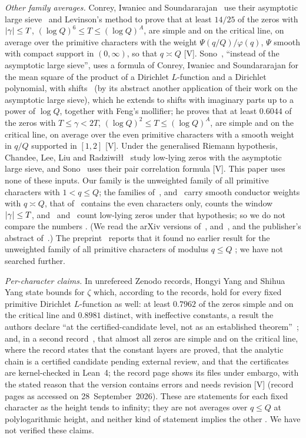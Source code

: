 \emph{Other family averages.} Conrey, Iwaniec and Soundararajan~\cite{CIS2} use their asymptotic large sieve~\cite{CIS1} and Levinson's method to
prove that at least $14/25$ of the zeros with $\lvert \gamma\rvert\le T$, $(\log Q)^6\le T\le(\log Q)^A$, are simple and on the critical line, on average over
the primitive characters with the weight $\Psi(q/Q)/\varphi(q)$, $\Psi$ smooth with compact support in $(0,\infty)$, so that $q\asymp Q$ [V].
Sono~\cite{Sono21}, ``instead of the asymptotic large sieve'', uses a formula of Conrey, Iwaniec and Soundararajan for the mean square of the product
of a Dirichlet $L$-function and a Dirichlet polynomial, with shifts~\cite{CIS19} (by its abstract another application of their work on the asymptotic
large sieve), which he extends to shifts with imaginary parts up to a power of $\log Q$, together with Feng's mollifier; he proves that at least $0.6044$ of the zeros with $T\le\gamma<2T$, $(\log Q)^2\le T\le(\log Q)^A$, are
simple and on the critical line, on average over the even primitive characters with a smooth weight in $q/Q$ supported in $[1,2]$ [V]. Under the
generalised Riemann hypothesis, Chandee, Lee, Liu and Radziwi\l\l~\cite{CLLR14} study low-lying zeros with the asymptotic large sieve, and
Sono~\cite{Sono16} uses their pair correlation formula [V]. This paper uses none of these inputs. Our family is the unweighted family of all primitive
characters with $1<q\le Q$; the families of~\cite{CIS2}, \cite{Sono21} and~\cite{CLLR14} carry smooth conductor weights with $q\asymp Q$, that
of~\cite{Sono21} contains the even characters only, \cite{CIS2} counts the window $\lvert \gamma\rvert\le T$, and~\cite{CLLR14} and~\cite{Sono16} count
low-lying zeros under that hypothesis; so we do not compare the numbers \tagM. (We read the arXiv versions
of~\cite{CIS2}, \cite{Sono21} and~\cite{CLLR14}, and the publisher's abstract of~\cite{Sono16}.) The preprint~\cite{DSouza} reports that it found no
earlier result for the unweighted family of all primitive characters of modulus $q\le Q$ \Vsim; we have not searched further.

\emph{Per-character claims.} In unrefereed Zenodo records, Hongyi Yang and Shihua Yang state bounds for $\zeta$ which, according to the records,
hold for every fixed primitive Dirichlet $L$-function as well: at least $0.7962$ of the zeros simple and on the critical line and $0.8981$ distinct,
with ineffective constants, a result the authors declare ``at the certified-candidate level, not as an established theorem''~\cite{YY1}; and, in a
second record~\cite{YY2}, that almost all zeros are simple and on the critical line, where the record states that the constant layers are proved,
that the analytic chain is a certified candidate pending external review, and that the certificates are kernel-checked in Lean~4; the record page
shows its files under embargo, with the stated reason that the version contains errors and needs revision [V] (record pages as accessed on
28~September~2026). These are statements for each fixed character as the height tends to infinity; they are not averages over $q\le Q$ at
polylogarithmic height, and neither kind of statement implies the other \tagM. We have not verified these claims.

